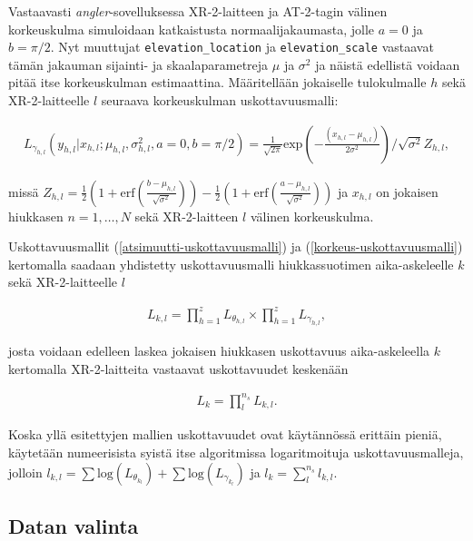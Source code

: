 \documentclass[
  12pt,
  a4paper, twoside]{book}
\begin{document}
Vastaavasti \emph{angler}-sovelluksessa XR-2-laitteen ja AT-2-tagin välinen korkeuskulma simuloidaan katkaistusta normaalijakaumasta, jolle \(a=0\) ja \(b=\pi/2\). Nyt muuttujat \texttt{elevation\_location} ja \texttt{elevation\_scale} vastaavat tämän jakauman sijainti- ja skaalaparametreja \(\mu\) ja \(\sigma^2\) ja näistä edellistä voidaan pitää itse korkeuskulman estimaattina. Määritellään jokaiselle tulokulmalle \(h\) sekä XR-2-laitteelle \(l\) seuraava korkeuskulman uskottavuusmalli:

\begin{align}\label{korkeus-uskottavuusmalli}
L_{\gamma_{h,l}}(y_{h,l}|x_{h,l}; \mu_{h,l}, \sigma^2_{h,l}, a=0, b=\pi/2)=\frac{1}{\sqrt{2 \pi}} \text{exp}\left(-\frac{(x_{h,l}-\mu_{h,l})}{2 \sigma^2}\right) / \sqrt{\sigma^2}Z_{h,l},
\end{align}

\noindent missä \(Z_{h,l}=\frac{1}{2}(1+\text{erf}(\frac{b-\mu_{h,l}}{\sqrt{\sigma^2}}))-\frac{1}{2}(1+\text{erf}(\frac{a-\mu_{h,l}}{\sqrt{\sigma^2}}))\) ja \(x_{h,l}\) on jokaisen hiukkasen \(n=1,\ldots,N\) sekä XR-2-laitteen \(l\) välinen korkeuskulma.

Uskottavuusmallit (\ref{atsimuutti-uskottavuusmalli}) ja (\ref{korkeus-uskottavuusmalli}) kertomalla saadaan yhdistetty uskottavuusmalli hiukkassuotimen aika-askeleelle \(k\) sekä XR-2-laitteelle \(l\)

\begin{align}\label{yhdistetty-uskottavuusmalli}
L_{k,l}=\prod_{h=1}^{z} L_{\theta_{h,l}} \times \prod_{h=1}^{z} L_{\gamma_{h,l}},
\end{align}

\noindent josta voidaan edelleen laskea jokaisen hiukkasen uskottavuus aika-askeleella \(k\) kertomalla XR-2-laitteita vastaavat uskottavuudet keskenään

\begin{align}\label{lopullinen-uskottavuusmalli}
L_{k}=\prod_l^{n_s} L_{{k,l}}.
\end{align}

Koska yllä esitettyjen mallien uskottavuudet ovat käytännössä erittäin pieniä, käytetään numeerisista syistä itse algoritmissa logaritmoituja uskottavuusmalleja, jolloin \(l_{k,l} = \sum\text{log}(L_{\theta_{k_l}}) + \sum\text{log}(L_{\gamma_{k_l}})\) ja \(l_k = \sum_l^{n_s} l_{k,l}\).

\subsection{Datan valinta}\label{datan-valinta}
\end{document}
